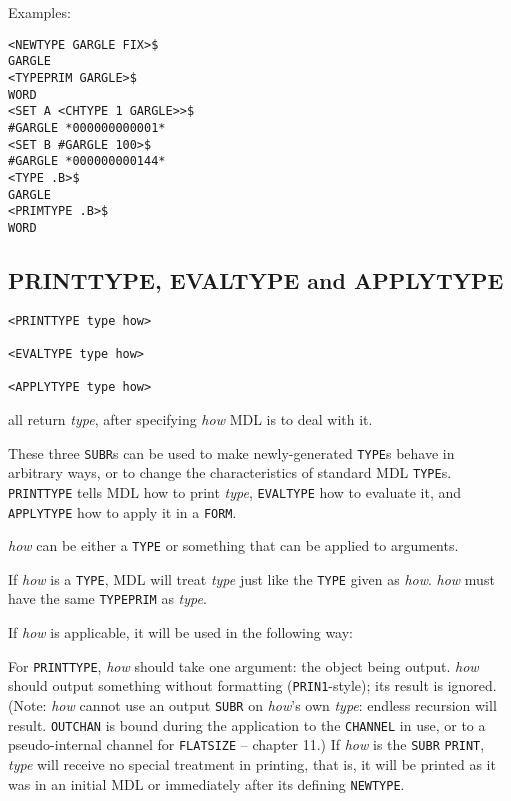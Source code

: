 \documentclass[a4paper]{scrbook}
\begin{document}
Examples:

\begin{verbatim}
<NEWTYPE GARGLE FIX>$
GARGLE
<TYPEPRIM GARGLE>$
WORD
<SET A <CHTYPE 1 GARGLE>>$
#GARGLE *000000000001*
<SET B #GARGLE 100>$
#GARGLE *000000000144*
<TYPE .B>$
GARGLE
<PRIMTYPE .B>$
WORD
\end{verbatim}

\subsection{PRINTTYPE, EVALTYPE and APPLYTYPE}\label{printtype-evaltype-and-applytype}

\begin{verbatim}
<PRINTTYPE type how>

<EVALTYPE type how>

<APPLYTYPE type how>
\end{verbatim}

all return \emph{type}, after specifying \emph{how} MDL is to deal with it.

These three \texttt{SUBR}s can be used to make newly-generated \texttt{TYPE}s behave in arbitrary ways, or to change the
characteristics of standard MDL \texttt{TYPE}s. \texttt{PRINTTYPE} tells MDL how to print
\emph{type}, \texttt{EVALTYPE} how to evaluate it, and
\texttt{APPLYTYPE} how to apply it in a \texttt{FORM}.

\emph{how} can be either a \texttt{TYPE} or something that can be applied to arguments.

If \emph{how} is a \texttt{TYPE}, MDL will treat \emph{type} just like the \texttt{TYPE} given as \emph{how}. \emph{how}
must have the same \texttt{TYPEPRIM} as \emph{type}.

If \emph{how} is applicable, it will be used in the following way:

For \texttt{PRINTTYPE}, \emph{how} should take one argument: the object being output. \emph{how} should output something
without formatting (\texttt{PRIN1}-style); its result is ignored. (Note: \emph{how} cannot use an output \texttt{SUBR} on
\emph{how}'s own \emph{type}: endless recursion will result. \texttt{OUTCHAN} is bound during the
application to the \texttt{CHANNEL} in use, or to a pseudo-internal channel for \texttt{FLATSIZE} -- chapter 11.) If
\emph{how} is the \texttt{SUBR} \texttt{PRINT}, \emph{type} will receive no special treatment in
printing, that is, it will be printed as it was in an initial MDL or immediately after its defining \texttt{NEWTYPE}.
\end{document}
